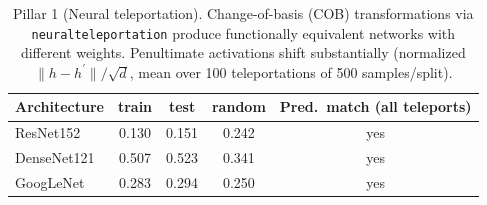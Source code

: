 \begin{table}[t]
\centering
\caption{Pillar 1 (Neural teleportation). Change-of-basis (COB) transformations via \texttt{neuralteleportation} produce functionally equivalent networks with different weights. Penultimate activations shift substantially (normalized $\|h - h^\prime\|/\sqrt{d}$, mean over 100 teleportations of 500 samples/split).}
\label{tab:teleport_summary}
\begin{tabular}{lcccc}
\toprule
Architecture & train & test & random & Pred.\ match (all teleports) \\
\midrule
ResNet152 & 0.130 & 0.151 & 0.242 & yes \\
DenseNet121 & 0.507 & 0.523 & 0.341 & yes \\
GoogLeNet & 0.283 & 0.294 & 0.250 & yes \\
\bottomrule
\end{tabular}
\end{table}